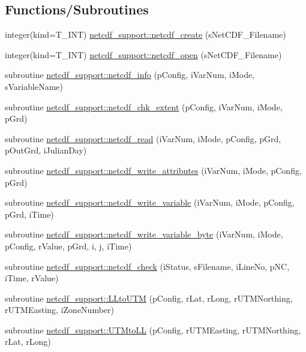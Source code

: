 \subsection*{Functions/Subroutines}
\begin{DoxyCompactItemize}
\item 
integer(kind=T\_\-INT) \hyperlink{namespacenetcdf__support_a9391bb174b4eadf498d9010f483b0f48}{netcdf\_\-support::netcdf\_\-create} (sNetCDF\_\-Filename)
\item 
integer(kind=T\_\-INT) \hyperlink{namespacenetcdf__support_a6eeec6c2df01a48a69ecbafb53b679d7}{netcdf\_\-support::netcdf\_\-open} (sNetCDF\_\-Filename)
\item 
subroutine \hyperlink{namespacenetcdf__support_aa89f8e8af31edb7d9f5c0ef77ef23768}{netcdf\_\-support::netcdf\_\-info} (pConfig, iVarNum, iMode, sVariableName)
\item 
subroutine \hyperlink{namespacenetcdf__support_adeaa2a22708c9c7348a906103ce38f34}{netcdf\_\-support::netcdf\_\-chk\_\-extent} (pConfig, iVarNum, iMode, pGrd)
\item 
subroutine \hyperlink{namespacenetcdf__support_afc78353319d2b16dc631863502467fd6}{netcdf\_\-support::netcdf\_\-read} (iVarNum, iMode, pConfig, pGrd, pOutGrd, iJulianDay)
\item 
subroutine \hyperlink{namespacenetcdf__support_aa64a311997b05e100af097459b0e757f}{netcdf\_\-support::netcdf\_\-write\_\-attributes} (iVarNum, iMode, pConfig, pGrd)
\item 
subroutine \hyperlink{namespacenetcdf__support_a8a7d46a6ddcdafb7d81472c7dbe3b231}{netcdf\_\-support::netcdf\_\-write\_\-variable} (iVarNum, iMode, pConfig, pGrd, iTime)
\item 
subroutine \hyperlink{namespacenetcdf__support_aea9ea475d261fc0de8af0a3d58111d4c}{netcdf\_\-support::netcdf\_\-write\_\-variable\_\-byte} (iVarNum, iMode, pConfig, rValue, pGrd, i, j, iTime)
\item 
subroutine \hyperlink{namespacenetcdf__support_a0d68b435588c00e7f5662b237c9bc4bc}{netcdf\_\-support::netcdf\_\-check} (iStatus, sFilename, iLineNo, pNC, iTime, rValue)
\item 
subroutine \hyperlink{namespacenetcdf__support_a90eb9a7158a90802c01b032c189ffa0b}{netcdf\_\-support::LLtoUTM} (pConfig, rLat, rLong, rUTMNorthing, rUTMEasting, iZoneNumber)
\item 
subroutine \hyperlink{namespacenetcdf__support_a2e192070d8bd34d10591e6de4dbfbce5}{netcdf\_\-support::UTMtoLL} (pConfig, rUTMEasting, rUTMNorthing, rLat, rLong)
\end{DoxyCompactItemize}
